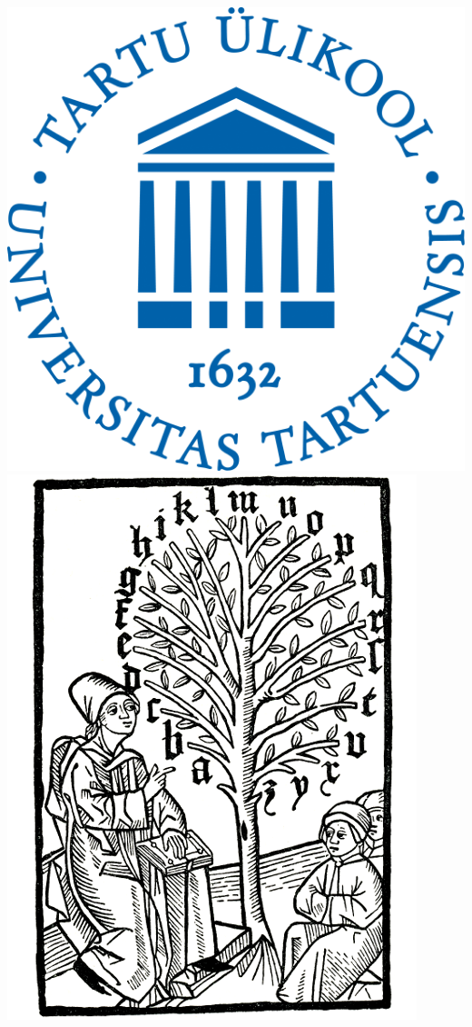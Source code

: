 \documentclass[a0,portrait]{a0poster}
\begin{document}
\begin{minipage}[b]{0.25\linewidth}
\includegraphics[scale=2]{figures/UTlogo}\qquad
\includegraphics[scale=1.8]{figures/NLTlogo}
\end{minipage}
\end{document}
